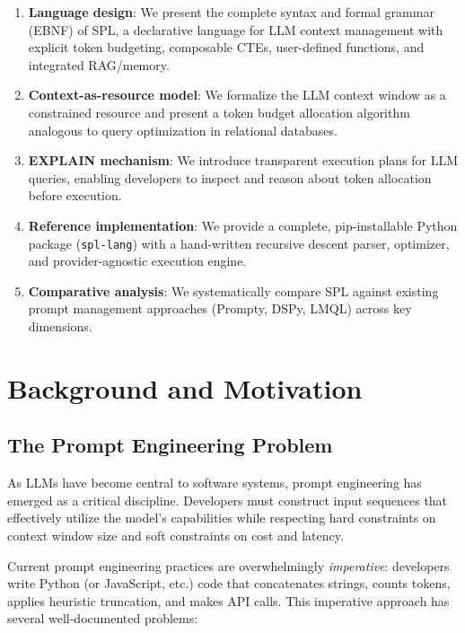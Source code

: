 \documentclass[11pt,a4paper]{article}
\begin{document}
\begin{enumerate}[nosep]
  \item \textbf{Language design}: We present the complete syntax and formal grammar (EBNF) of SPL, a declarative language for LLM context management with explicit token budgeting, composable CTEs, user-defined functions, and integrated RAG/memory.
  \item \textbf{Context-as-resource model}: We formalize the LLM context window as a constrained resource and present a token budget allocation algorithm analogous to query optimization in relational databases.
  \item \textbf{EXPLAIN mechanism}: We introduce transparent execution plans for LLM queries, enabling developers to inspect and reason about token allocation before execution.
  \item \textbf{Reference implementation}: We provide a complete, pip-installable Python package (\texttt{spl-lang}) with a hand-written recursive descent parser, optimizer, and provider-agnostic execution engine.
  \item \textbf{Comparative analysis}: We systematically compare SPL against existing prompt management approaches (Prompty, DSPy, LMQL) across key dimensions.
\end{enumerate}

\section{Background and Motivation}
\label{sec:background}

\subsection{The Prompt Engineering Problem}

As LLMs have become central to software systems, prompt engineering has emerged as a critical discipline. Developers must construct input sequences that effectively utilize the model's capabilities while respecting hard constraints on context window size and soft constraints on cost and latency.

Current prompt engineering practices are overwhelmingly \emph{imperative}: developers write Python (or JavaScript, etc.) code that concatenates strings, counts tokens, applies heuristic truncation, and makes API calls. This imperative approach has several well-documented problems:
\end{document}
